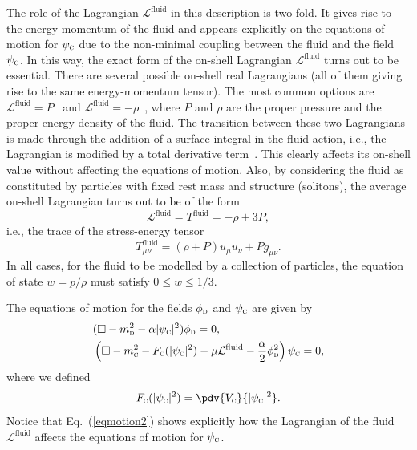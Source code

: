 \documentclass[letterpaper,12pt,titlepage,oneside,final]{book}
\newcommand{\tc}[1]{\textsc{#1}}
\begin{document}
The role of the Lagrangian $\mathcal{L}^{\textrm{fluid}}$ in this description is two-fold. It gives rise to the energy-momentum of the fluid and appears explicitly on the equations of motion for $\psi_\tc{c}$ due to the non-minimal coupling between the fluid and the field $\psi_{\tc{c}}$. In this way, the exact form of the on-shell Lagrangian $\mathcal{L}^{\textrm{fluid}}$ turns out to be essential. There are several possible on-shell real Lagrangians (all of them giving rise to the same energy-momentum tensor). The most common options are $\mathcal{L}^\textrm{fluid}=P$~\cite{Schutz1970} and $\mathcal{L}^\textrm{fluid}=-\rho$~\cite{Brown1993}, where $P$ and $\rho$ are the proper pressure and the proper energy density of the fluid. The transition between these two Lagrangians is made through the addition of a surface integral in the fluid action, i.e., the Lagrangian is modified by a total derivative term~\cite{Brown1993}. This clearly affects its on-shell value without affecting the equations of motion. Also, by considering the fluid as constituted by particles with fixed rest mass and structure (solitons), the average on-shell Lagrangian turns out to be of the form~\cite{Avelino2018} 
\begin{equation}
    \mathcal{L}^{\textrm{fluid}} = T^{\textrm{fluid}} = -\rho+3P,
\end{equation}
i.e., the trace of the stress-energy tensor 
\begin{equation}
    T^\textrm{fluid}_{\mu\nu}  =  (\rho + P)u_\mu u_\nu+ P g_{\mu\nu}.
\end{equation}
In all cases, for the fluid to be modelled by a collection of particles, the equation of state $w=p/\rho$ must satisfy $0\leq w\leq 1/3$. 

The equations of motion for the fields $\phi_\tc{d}$ and $\psi_\tc{c}$ are given  by
\begin{subequations}
      \begin{align}
        & (\Box-m_\tc{d}^2 - \alpha|\psi_\tc{c}|^2)\phi_\tc{d}  = 0,\label{eqmotion1}\\
        &\left(\Box-m_\tc{c}^2- F_\tc{c}(|\psi_\tc{c}|^2) -\mu  \mathcal{L}^{\textrm{fluid}}- \frac{\alpha}{2}\phi_\tc{d}^2\right) \psi_{\tc{c}} = 0,\label{eqmotion2}
      \end{align}
      \label{eqmotion}
    \end{subequations}
where we defined
\begin{equation}
    F_\tc{c}(|\psi_\tc{c}|^2) = \pdv{V_{\tc{c}}}{|\psi_{\tc{c}}|^2}.
\end{equation}
Notice that Eq.~(\ref{eqmotion2}) shows explicitly how the Lagrangian of the fluid $\mathcal{L}^{\textrm{fluid}}$ affects the equations of motion for $\psi_\tc{c}$.
\end{document}
